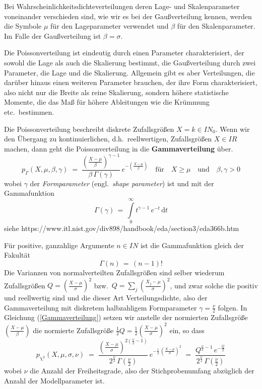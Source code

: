 Bei Wahrscheinlichkeitsdichteverteilungen deren Lage- und Skalenparameter
voneinander verschieden sind, wie wir es bei der Gaußverteilung kennen, werden die
Symbole $\mu$ für den Lageparameter verwendet und $\beta$ für den Skalenparameter.
Im Falle der Gaußverteilung ist $\beta = \sigma$.

Die Poissonverteilung ist eindeutig durch einen Parameter charakterisiert, der sowohl
die Lage als auch die Skalierung bestimmt, die Gaußverteilung durch zwei Parameter, die
Lage und die Skalierung. Allgemein gibt es aber Verteilungen, die darüber hinaus einen
weiteren Parameter brauchen, der ihre Form charakterisiert, also nicht nur die Breite als
reine Skalierung, sondern höhere statistische Momente, die das Maß für höhere Ableitungen
wie die Krümmung etc.\ bestimmen.

Die Poissonverteilung beschreibt diskrete Zufallsgrößen $X = k \in I \!\! N_0$. Wenn wir den Übergang
zu kontinuierlichen, d.h.\ reellwertigen, Zufallsgrößen $X \in I \!\! R$ machen, dann geht die
Poissonverteilung in die \textbf{Gammaverteilung} über.
\begin{equation}
p_\Gamma(X, \mu, \beta, \gamma) \; = \; \frac{\left(\frac{X - \mu}{\beta}\right)^{\gamma-1}}{\beta \, \Gamma(\gamma)}
 \, e^{-\left(\frac{X - \mu}{\beta}\right)}
 \quad \text{f\"ur} \quad X \geq \mu \quad \text{und} \quad \beta, \gamma > 0
\label{Gammaverteilung}
\end{equation}
wobei $\gamma$ der \textsl{Formparameter} (engl.\ \textsl{shape parameter}) ist und mit der Gammafunktion
$$
\Gamma(\gamma) \, = \, \int\limits_{0}^{\infty} t^{\gamma - 1} \, e^{-t} \, \mathrm{d}t
$$
siehe https://www.itl.nist.gov/div898/handbook/eda/section3/eda366b.htm

Für positive, ganzahlige Argumente $n \in I \!\! N$ ist die Gammafunktion gleich der Fakultät
$$
\Gamma(n) \, = \, (n - 1)!
$$
Die Varianzen von normalverteilten Zufallsgrößen sind selber wiederum
Zufallsgrößen $Q = \left(\frac{X - \mu}{\sigma}\right)^2$ bzw.\
$Q = \sum\limits_j \left(\frac{X_j - \mu}{\sigma}\right)^2$,
und zwar solche die positiv und reellwertig sind und die dieser Art Verteilungsdichte,
also der Gammaverteilung mit diskretem halbzahligem Formparameter $\gamma = \frac{\nu}{2}$ folgen.
In Gleichung (\ref{Gammaverteilung}) setzen wir anstelle der normierten
Zufallsgröße $\left(\frac{X - \mu}{\beta}\right)$ die normierte Zufallsgröße
$\frac{1}{2} Q = \frac{1}{2} \left(\frac{X - \mu}{\sigma}\right)^2$ ein, so dass
\begin{equation}
p_\mathrm{\chi^2}(X, \mu, \sigma, \nu) \; = \;
\frac{\left(\frac{X - \mu}{\sigma}\right)^{2 (\frac{\nu}{2} - 1) }}{2^{\frac{\nu}{2}} \, \Gamma(\frac{\nu}{2})}\,
 e^{-\frac{1}{2} \, \left(\frac{X - \mu}{\sigma}\right)^2}
 \; = \; \frac{Q^{\frac{\nu}{2} - 1} \,
  e^{-\frac{Q}{2}}}{2^{\frac{\nu}{2}} \, \Gamma(\frac{\nu}{2})}
\label{Chi2pdfgamma}
\end{equation}
wobei $\nu$ die Anzahl der Freiheitsgrade, also der Stichprobenumfang abzüglich der Anzahl der
Modellparameter ist.


